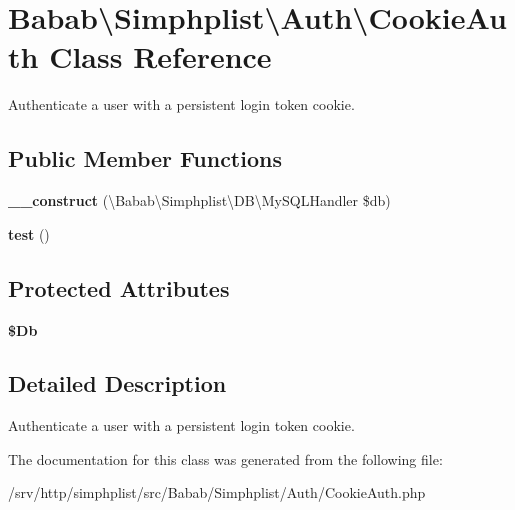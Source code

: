 \hypertarget{classBabab_1_1Simphplist_1_1Auth_1_1CookieAuth}{\section{Babab\textbackslash{}Simphplist\textbackslash{}Auth\textbackslash{}Cookie\+Auth Class Reference}
\label{classBabab_1_1Simphplist_1_1Auth_1_1CookieAuth}
}


Authenticate a user with a persistent login token cookie.  


\subsection*{Public Member Functions}
\begin{DoxyCompactItemize}
\item 
\hypertarget{classBabab_1_1Simphplist_1_1Auth_1_1CookieAuth_a5e3bc1d161efd497e83a56ff8a95e159}{{\bfseries \+\_\+\+\_\+construct} (\textbackslash{}Babab\textbackslash{}\+Simphplist\textbackslash{}\+D\+B\textbackslash{}\+My\+S\+Q\+L\+Handler \$db)}\label{classBabab_1_1Simphplist_1_1Auth_1_1CookieAuth_a5e3bc1d161efd497e83a56ff8a95e159}

\item 
\hypertarget{classBabab_1_1Simphplist_1_1Auth_1_1CookieAuth_aabbd382d85bbd93b6b5935e177d2babc}{{\bfseries test} ()}\label{classBabab_1_1Simphplist_1_1Auth_1_1CookieAuth_aabbd382d85bbd93b6b5935e177d2babc}

\end{DoxyCompactItemize}
\subsection*{Protected Attributes}
\begin{DoxyCompactItemize}
\item 
\hypertarget{classBabab_1_1Simphplist_1_1Auth_1_1CookieAuth_a10fc1e052507e4f4d4aceb77f5e9b0d4}{{\bfseries \$\+Db}}\label{classBabab_1_1Simphplist_1_1Auth_1_1CookieAuth_a10fc1e052507e4f4d4aceb77f5e9b0d4}

\end{DoxyCompactItemize}


\subsection{Detailed Description}
Authenticate a user with a persistent login token cookie. 

The documentation for this class was generated from the following file\+:\begin{DoxyCompactItemize}
\item 
/srv/http/simphplist/src/\+Babab/\+Simphplist/\+Auth/Cookie\+Auth.\+php\end{DoxyCompactItemize}
